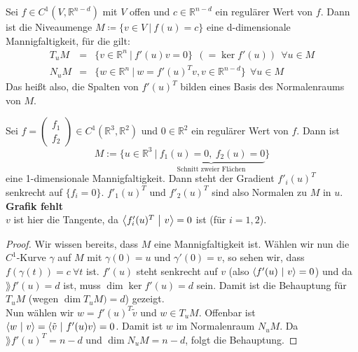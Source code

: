 \begin{satz}
Sei $f\in C^1\left(V,\mathbb{R}^{n-d}\right)$ mit $V$ offen und $c\in\mathbb{R}^{n-d}$ ein regulärer Wert von $f$. Dann ist die Niveaumenge $M\coloneqq\{v\in V \ | \ f(u)=c\}$ eine d-dimensionale Mannigfaltigkeit, für die gilt:
\begin{eqnarray*}
T_uM &=&\{v\in\mathbb{R}^n \ | \ f'(u)v=0\} \ \ \left(=\ker f'(u)\right) \ \ \forall u\in M \\
N_uM&=&\{w\in\mathbb{R}^n \ | \ w=f'(u)^Tv, v\in\mathbb{R}^{n-d}\} \ \ \forall u\in M 
\end{eqnarray*}
Das heißt also, die Spalten von $f'(u)^T$ bilden eines Basis des Normalenraums von $M$.
\end{satz}

\begin{beispiel}
Sei $f=\begin{pmatrix}
f_1 \\ f_2
\end{pmatrix}\in C^1\left(\mathbb{R}^3,\mathbb{R}^2\right)$ und $0\in\mathbb{R}^2$ ein regulärer Wert von $f$. Dann ist
\begin{equation*}
M:=\{u\in\mathbb{R}^3 \ | \underbrace{\ f_1(u)=0, \ f_2(u)=0}_{\text{Schnitt \ zweier \ Flächen}}\}
\end{equation*}
eine 1-dimensionale Mannigfaltigkeit. Dann steht der Gradient $f'_i(u)^T$ senkrecht auf $\{f_i=0\}$. $f'_1(u)^T$ und $f'_2(u)^T$ sind also Normalen zu $M$ in $u$.\\
\textbf{Grafik fehlt}\\
$v$ ist hier die Tangente, da $\left\langle f'_i(u)^T \ \middle| \ v\right\rangle=0$ ist (für $i=1,2$).
\end{beispiel}

\begin{proof}
Wir wissen bereits, dass $M$ eine Mannigfaltigkeit ist. Wählen wir nun die $C^1$-Kurve $\gamma$ auf $M$ mit $\gamma(0)=u$ und $\gamma'(0)=v$, so sehen wir, dass $f(\gamma(t))=c \ \forall t$ ist. $f'(u)$ steht senkrecht auf $v$ (also $\left\langle f'(u) \ \middle| \ v\right\rangle=0$) und da $\rang f'(u)=d$ ist, muss $\dim \ker f'(u)=d$ sein. Damit ist die Behauptung für $T_uM$ (wegen $\dim T_uM)=d$) gezeigt.\\
Nun wählen wir $w=f'(u)^T\tilde{v}$ und $w\in T_uM$. Offenbar ist $\left\langle w \ \middle| \ v\right\rangle=\left\langle \tilde{v} \ \middle| \ f'(u)v\right\rangle=0$. Damit ist $w$ im Normalenraum $N_uM$. Da $\rang f'(u)^T=n-d$  und $\dim N_uM=n-d$, folgt die Behauptung.
\end{proof}

